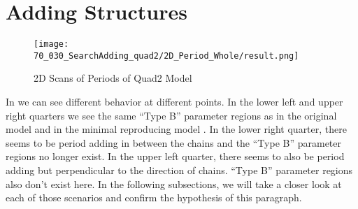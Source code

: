 \section{Adding Structures}

\begin{figure}
    \centering
    \texttt{[image: 70\_030\_SearchAdding\_quad2/2D\_Period\_Whole/result.png]}
    \label{fig:adding.period.whole}
    \caption{2D Scans of Periods of Quad2 Model}
\end{figure}

In  we can see different behavior at different points.
In the lower left and upper right quarters we see the same ``Type B'' parameter regions as in the original model  and in the minimal reproducing model .
In the lower right quarter, there seems to be period adding in between the chains and the ``Type B'' parameter regions no longer exist.
In the upper left quarter, there seems to also be period adding but perpendicular to the direction of chains.
``Type B'' parameter regions also don't exist here.
In the following subsections, we will take a closer look at each of those scenarios and confirm the hypothesis of this paragraph.




